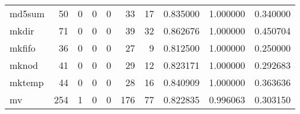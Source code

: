 \begin{longtable}{lrrrrrrrrr}
md5sum    &                                        50 &                                                  0 &                                                  0 &                                                  0 &                                                 33 &                                                 17 &                                           0.835000 &                               1.000000 &                             0.340000 \\
mkdir     &                                        71 &                                                  0 &                                                  0 &                                                  0 &                                                 39 &                                                 32 &                                           0.862676 &                               1.000000 &                             0.450704 \\
mkfifo    &                                        36 &                                                  0 &                                                  0 &                                                  0 &                                                 27 &                                                  9 &                                           0.812500 &                               1.000000 &                             0.250000 \\
mknod     &                                        41 &                                                  0 &                                                  0 &                                                  0 &                                                 29 &                                                 12 &                                           0.823171 &                               1.000000 &                             0.292683 \\
mktemp    &                                        44 &                                                  0 &                                                  0 &                                                  0 &                                                 28 &                                                 16 &                                           0.840909 &                               1.000000 &                             0.363636 \\
mv        &                                       254 &                                                  1 &                                                  0 &                                                  0 &                                                176 &                                                 77 &                                           0.822835 &                               0.996063 &                             0.303150 \\

\end{longtable}
